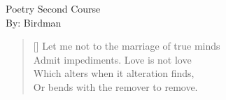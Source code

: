 \documentclass[12pt, a4paper]{memoir}
\begin{document}
\begin{center}
\huge{Poetry Second Course}\\[0.5cm]
\Large{By: Birdman}\\[1cm]
\end{center}

\settowidth{\versewidth}{Let me not to the marriage of true minds}
\begin{verse}[\versewidth]
{\fontverse
  Let me not to the marriage of true minds \\
Admit impediments. Love is not love \\
Which alters when it alteration finds,\\ 
Or bends with the remover to remove.
}
\end{verse}
{\fontpar
}
\end{document}
